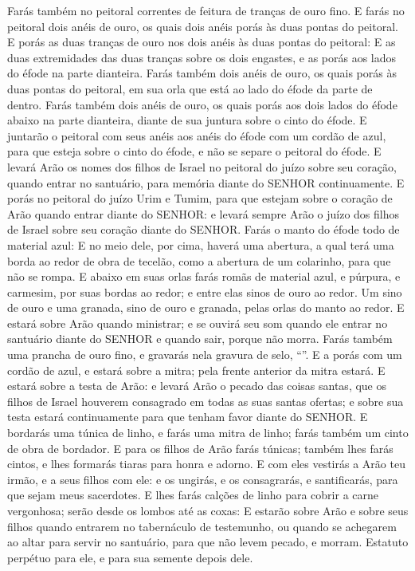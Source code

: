 {{  Farás também no peitoral correntes de feitura de tranças de ouro fino.
  E farás no peitoral dois anéis de ouro, os quais dois anéis porás às duas pontas do peitoral.
  E porás as duas tranças de ouro nos dois anéis às duas pontas do peitoral:
  E as duas extremidades das duas tranças sobre os dois engastes, e as porás aos lados do éfode na parte dianteira.
  Farás também dois anéis de ouro, os quais porás às duas pontas do peitoral, em sua orla que está ao lado do éfode da parte de dentro.
  Farás também dois anéis de ouro, os quais porás aos dois lados do éfode abaixo na parte dianteira, diante de sua juntura sobre o cinto do éfode.
  E juntarão o peitoral com seus anéis aos anéis do éfode com um cordão de azul, para que esteja sobre o cinto do éfode, e não se separe o peitoral do éfode.
  E levará Arão os nomes dos filhos de Israel no peitoral do juízo sobre seu coração, quando entrar no santuário, para memória diante do SENHOR continuamente.
  E porás no peitoral do juízo Urim e Tumim, para que estejam sobre o coração de Arão quando entrar diante do SENHOR: e levará sempre Arão o juízo dos filhos de Israel sobre seu coração diante do SENHOR.
  Farás o manto do éfode todo de material azul:
  E no meio dele, por cima, haverá uma abertura, a qual terá uma borda ao redor de obra de tecelão, como a abertura de um colarinho, para que não se rompa. %
  E abaixo em suas orlas farás romãs de material azul, e púrpura, e carmesim, por suas bordas ao redor; e entre elas sinos de ouro ao redor.
  Um sino de ouro e uma granada, sino de ouro e granada, pelas orlas do manto ao redor.
  E estará sobre Arão quando ministrar; e se ouvirá seu som quando ele entrar no santuário diante do SENHOR e quando sair, porque não morra.
  Farás também uma prancha de ouro fino, e gravarás nela gravura de selo, \enquote{}.
  E a porás com um cordão de azul, e estará sobre a mitra; pela frente anterior da mitra estará.
  E estará sobre a testa de Arão: e levará Arão o pecado das coisas santas, que os filhos de Israel houverem consagrado em todas as suas santas ofertas; e sobre sua testa estará continuamente para que tenham favor diante do SENHOR.
  E bordarás uma túnica de linho, e farás uma mitra de linho; farás também um cinto de obra de bordador.
  E para os filhos de Arão farás túnicas; também lhes farás cintos, e lhes formarás tiaras para honra e adorno.
  E com eles vestirás a Arão teu irmão, e a seus filhos com ele: e os ungirás, e os consagrarás, e santificarás, para que sejam meus sacerdotes.
  E lhes farás calções de linho para cobrir a carne vergonhosa; serão desde os lombos até as coxas:
  E estarão sobre Arão e sobre seus filhos quando entrarem no tabernáculo de testemunho, ou quando se achegarem ao altar para servir no santuário, para que não levem pecado, e morram. Estatuto perpétuo para ele, e para sua semente depois dele}.
\par }

